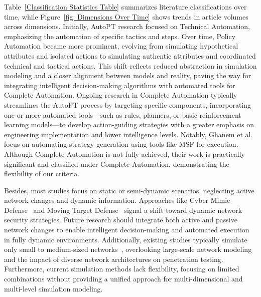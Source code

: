 Table~\ref{Classification Statistics Table} summarizes literature classifications over time, while Figure~\ref{fig: Dimensions Over Time} shows trends in article volumes across dimensions. Initially, AutoPT research focused on Technical Automation, emphasizing the automation of specific tactics and steps. Over time, Policy Automation became more prominent, evolving from simulating hypothetical attributes and isolated actions to simulating authentic attributes and coordinated technical and tactical actions. This shift reflects reduced abstraction in simulation modeling and a closer alignment between models and reality, paving the way for integrating intelligent decision-making algorithms with automated tools for Complete Automation. Ongoing research in Complete Automation typically streamlines the AutoPT process by targeting specific components, incorporating one or more automated tools—such as rules, planners, or basic reinforcement learning models—to develop action-guiding strategies with a greater emphasis on engineering implementation and lower intelligence levels. Notably, Ghanem et al.~\cite{ghanem2019reinforcement} focus on automating strategy generation using tools like MSF for execution. Although Complete Automation is not fully achieved, their work is practically significant and classified under Complete Automation, demonstrating the flexibility of our criteria.


Besides, most studies focus on static or semi-dynamic scenarios, neglecting active network changes and dynamic information. Approaches like Cyber Mimic Defense~\cite{2016Research} and Moving Target Defense~\cite{2011Moving} signal a shift toward dynamic network security strategies. Future research should integrate both active and passive network changes to enable intelligent decision-making and automated execution in fully dynamic environments. Additionally, existing studies typically simulate only small to medium-sized networks~\cite{Cyberbattlesim, li2024dynpen, applebaum2017analysis}, overlooking large-scale network modeling and the impact of diverse network architectures on penetration testing. Furthermore, current simulation methods lack flexibility, focusing on limited combinations without providing a unified approach for multi-dimensional and multi-level simulation modeling.



